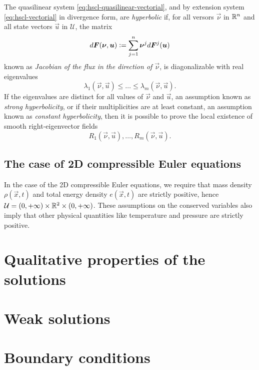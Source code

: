 \begin{defi}
The quasilinear system \eqref{eq:hscl-quasilinear-vectorial},
and by extension system \eqref{eq:hscl-vectorial} in divergence form,
are \emph{hyperbolic} if, for all versors $\vec{\nu}$ in $\mathbb{R}^n$ and all state
vectors $\vec{u}$ in $\mathcal{U}$, the matrix
\[
d\bm{F}(\bm{\nu},\bm{u}) \vcentcolon= \sum_{j=1}^n \bm{\nu}^j d\bm{F}^j(\bm{u})
\]
known as \emph{Jacobian of the flux in the direction of $\vec{\nu}$},
is diagonalizable with real eigenvalues
\[
\lambda_1(\vec{\nu},\vec{u}) \leq \dots \leq \lambda_m (\vec{\nu},\vec{u}).
\]
If the eigenvalues are distinct for all values of $\vec{\nu}$ and $\vec{u}$,
an assumption known as \emph{strong hyperbolicity},
or if their multiplicities are at least constant, an assumption
known as \emph{constant hyperbolicity}, then it is possible to
prove the local existence of smooth right-eigenvector fields
\[
R_1(\vec{\nu},\vec{u}), \dots, R_m (\vec{\nu},\vec{u}).
\]
\end{defi}



\clearpage


\subsection*{The case of 2D compressible Euler equations}

In the case of the 2D compressible Euler equations, we require that
mass density $\rho(\vec{x},t)$ and total energy density $e(\vec{x},t)$
are strictly positive, hence
$\mathcal{U} = (0,+\infty) \times \mathbb{R}^2 \times (0,+\infty)$.
These assumptions on the conserved variables also imply that
other physical quantities like temperature and pressure are strictly
positive.

\section{Qualitative properties of the solutions}

\section{Weak solutions}

\section{Boundary conditions}











